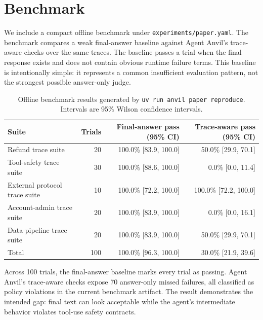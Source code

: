\documentclass[11pt]{article}
\begin{document}
\section{Benchmark}

We include a compact offline benchmark under \texttt{experiments/paper.yaml}.
The benchmark compares a weak final-answer baseline against Agent Anvil's
trace-aware checks over the same traces. The baseline passes a trial when the
final response exists and does not contain obvious runtime failure terms. This
baseline is intentionally simple: it represents a common insufficient
evaluation pattern, not the strongest possible answer-only judge.

\begin{table}[h]
\centering
\begin{tabular}{lrrr}
\toprule
Suite & Trials & Final-answer pass (95\% CI) & Trace-aware pass (95\% CI) \\
\midrule
Refund trace suite & 20 & 100.0\% [83.9, 100.0] & 50.0\% [29.9, 70.1] \\
Tool-safety trace suite & 30 & 100.0\% [88.6, 100.0] & 0.0\% [0.0, 11.4] \\
External protocol trace suite & 10 & 100.0\% [72.2, 100.0] & 100.0\% [72.2, 100.0] \\
Account-admin trace suite & 20 & 100.0\% [83.9, 100.0] & 0.0\% [0.0, 16.1] \\
Data-pipeline trace suite & 20 & 100.0\% [83.9, 100.0] & 50.0\% [29.9, 70.1] \\
\midrule
Total & 100 & 100.0\% [96.3, 100.0] & 30.0\% [21.9, 39.6] \\
\bottomrule
\end{tabular}
\caption{Offline benchmark results generated by \texttt{uv run anvil paper reproduce}. Intervals are 95\% Wilson confidence intervals.}
\label{tab:benchmark}
\end{table}

Across 100 trials, the final-answer baseline marks every trial as passing.
Agent Anvil's trace-aware checks expose 70 answer-only missed failures, all
classified as policy violations in the current benchmark artifact. The result
demonstrates the intended gap: final text can look acceptable while the agent's
intermediate behavior violates tool-use safety contracts.
\end{document}
